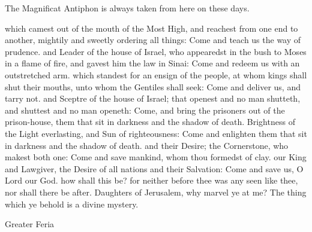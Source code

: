 \begin{rubric}
    The Magnificat Antiphon is always taken from here on these days.
\end{rubric}
\begin{multicols}{2}
 {\dag} which camest out of the mouth of the Most High, and reachest from one end to another, mightily and sweetly ordering all things: Come and teach us the way of prudence.
 {\dag} and Leader of the house of Israel, who appearedst in the bush to Moses in a flame of fire, and gavest him the law in Sinai: Come and redeem us with an outstretched arm.
 {\dag} which standest for an ensign of the people, at whom kings shall shut their mouths, unto whom the Gentiles shall seek: Come and deliver us, and tarry not.
 {\dag} and Sceptre of the house of Israel; that openest and no man shutteth, and shuttest and no man openeth: Come, and bring the prisoners out of the prison-house, them that sit in darkness and the shadow of death.
 {\dag} Brightness of the Light everlasting, and Sun of righteousness: Come and enlighten them that sit in darkness and the shadow of death.
 {\dag} and their Desire; the Cornerstone, who makest both one: Come and save mankind, whom thou formedst of clay.
 {\dag} our King and Lawgiver, the Desire of all nations and their Salvation: Come and save us, O Lord our God.
 {\dag} how shall this be? for neither before thee was any seen like thee, nor shall there be after. Daughters of Jerusalem, why marvel ye at me? The thing which ye behold is a divine mystery.
\end{multicols}

\begin{inhead}
{Greater Feria}
\end{inhead}
\par\noindent
{}

